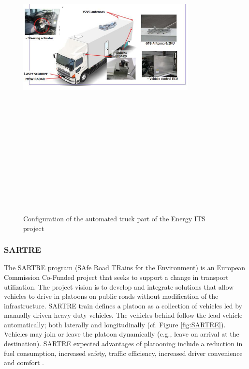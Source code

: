 \begin{figure}[!h]
        \centering 
        \includegraphics[width=9cm,height=18cm,keepaspectratio]{chapters/Chapitre_2/Figures/ITS.png}
        \caption{Configuration of the automated truck part of the Energy ITS project \cite{tsugawa2014results}}
        \label{fig:Energy_ITS}
        \end{figure}







\subsubsection{SARTRE}
The SARTRE program (SAfe Road TRains for the Environment) \cite{bergenhem2010challenges}\cite{chan2016sartre} is an European Commission Co-Funded project that seeks to support a change in transport utilization. The project vision is to develop and integrate solutions that allow vehicles to drive in platoons on public roads without modification of the infrastructure. SARTRE train defines a platoon as a collection of vehicles led by manually driven heavy-duty vehicles. The vehicles behind follow the lead vehicle automatically; both laterally and longitudinally (cf. Figure \ref{fig:SARTRE}). Vehicles may join or leave the platoon dynamically (e.g., leave on arrival at the destination). SARTRE expected advantages of platooning include a reduction in fuel consumption, increased safety, traffic efficiency, increased driver convenience and comfort \cite{chan2012cooperative}\cite{2011-36-0060}.



